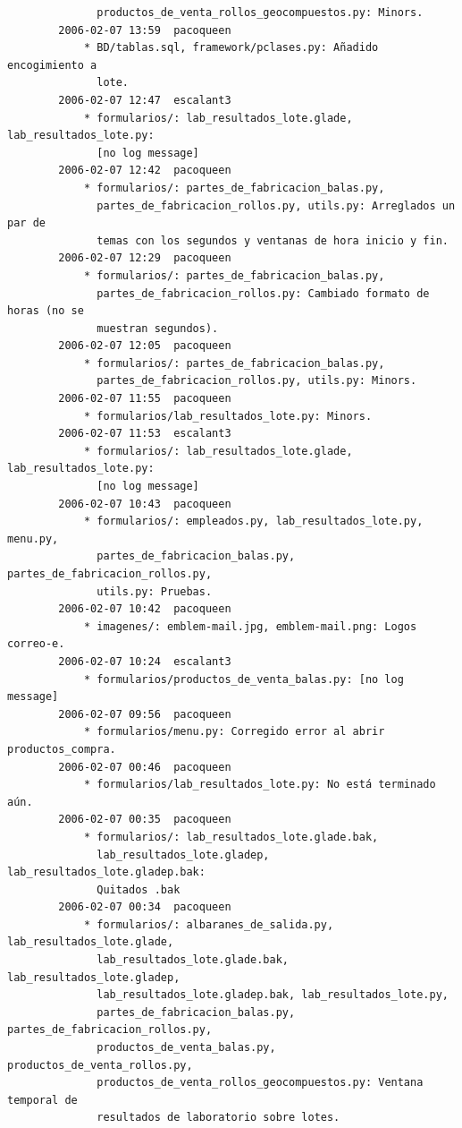 \documentclass[a4paper]{article}
\begin{document}
\begin{verbatim}
              productos_de_venta_rollos_geocompuestos.py: Minors.
        2006-02-07 13:59  pacoqueen
            * BD/tablas.sql, framework/pclases.py: Añadido encogimiento a
              lote.
        2006-02-07 12:47  escalant3
            * formularios/: lab_resultados_lote.glade, lab_resultados_lote.py:
              [no log message]
        2006-02-07 12:42  pacoqueen
            * formularios/: partes_de_fabricacion_balas.py,
              partes_de_fabricacion_rollos.py, utils.py: Arreglados un par de
              temas con los segundos y ventanas de hora inicio y fin.
        2006-02-07 12:29  pacoqueen
            * formularios/: partes_de_fabricacion_balas.py,
              partes_de_fabricacion_rollos.py: Cambiado formato de horas (no se
              muestran segundos).
        2006-02-07 12:05  pacoqueen
            * formularios/: partes_de_fabricacion_balas.py,
              partes_de_fabricacion_rollos.py, utils.py: Minors.
        2006-02-07 11:55  pacoqueen
            * formularios/lab_resultados_lote.py: Minors.
        2006-02-07 11:53  escalant3
            * formularios/: lab_resultados_lote.glade, lab_resultados_lote.py:
              [no log message]
        2006-02-07 10:43  pacoqueen
            * formularios/: empleados.py, lab_resultados_lote.py, menu.py,
              partes_de_fabricacion_balas.py, partes_de_fabricacion_rollos.py,
              utils.py: Pruebas.
        2006-02-07 10:42  pacoqueen
            * imagenes/: emblem-mail.jpg, emblem-mail.png: Logos correo-e.
        2006-02-07 10:24  escalant3
            * formularios/productos_de_venta_balas.py: [no log message]
        2006-02-07 09:56  pacoqueen
            * formularios/menu.py: Corregido error al abrir productos_compra.
        2006-02-07 00:46  pacoqueen
            * formularios/lab_resultados_lote.py: No está terminado aún.
        2006-02-07 00:35  pacoqueen
            * formularios/: lab_resultados_lote.glade.bak,
              lab_resultados_lote.gladep, lab_resultados_lote.gladep.bak:
              Quitados .bak
        2006-02-07 00:34  pacoqueen
            * formularios/: albaranes_de_salida.py, lab_resultados_lote.glade,
              lab_resultados_lote.glade.bak, lab_resultados_lote.gladep,
              lab_resultados_lote.gladep.bak, lab_resultados_lote.py,
              partes_de_fabricacion_balas.py, partes_de_fabricacion_rollos.py,
              productos_de_venta_balas.py, productos_de_venta_rollos.py,
              productos_de_venta_rollos_geocompuestos.py: Ventana temporal de
              resultados de laboratorio sobre lotes.

\end{verbatim}
\end{document}
